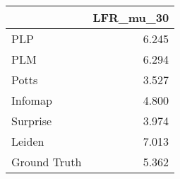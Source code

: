 \begin{tabular}{lr}
\toprule
{} & LFR_mu_30 \\
\midrule
PLP          &     6.245 \\
PLM          &     6.294 \\
Potts        &     3.527 \\
Infomap      &     4.800 \\
Surprise     &     3.974 \\
Leiden       &     7.013 \\
Ground Truth &     5.362 \\
\bottomrule
\end{tabular}
